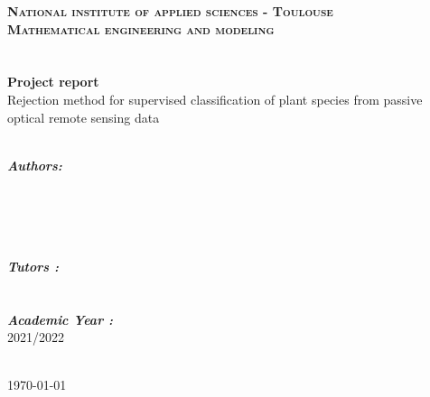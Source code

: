 \newpage

\begin{titlepage}
\begin{center} 

\vspace*{\fill}


\textbf{\textsc{\LARGE National institute of applied sciences - Toulouse}\\[2cm]}
\textsc{\Large \textbf{Mathematical engineering and modeling}}\\  
\\ [0.25cm]

\HRule \\[0.4cm]
{\huge \textbf{Project report\\[0.2cm] }}
{\LARGE Rejection method for supervised classification of plant species from passive optical remote sensing data\\
[0.4cm] }
\HRule \\[5cm]

\begin{minipage}{0.4\textwidth}
\begin{flushleft} \large
\emph{\textbf{Authors:}}\\[0.1cm]
\\
\\
\\
\\
\end{flushleft}
\end{minipage}
\begin{minipage}{0.4\textwidth}
\begin{flushright} \large
\emph{\textbf{Tutors :}} \\[0.1cm]
\\
\\[0.3cm]
\emph{\textbf{Academic Year :}} \\[0.1cm]
2021/2022\\[0.7cm]
\end{flushright}
\end{minipage}\\[1cm]

\today

\vspace*{\fill}
\end{center}
\end{titlepage}
